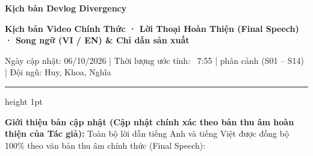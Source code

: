 \documentclass[11pt,a4paper]{article}
\begin{document}
{\LARGE\bfseries\color{divergencynavy} Kịch bản Devlog Divergency}\par
{\large\bfseries\color{divergencyaccent} Kịch bản Video Chính Thức · Lời Thoại Hoàn Thiện (Final Speech) · Song ngữ (VI / EN) \& Chỉ dẫn sản xuất}\par
\vspace{0.2em}
{\small Ngày cập nhật: 06/10/2026 \quad | \quad Thời lượng ước tính: ~7:55 \quad |  phân cảnh (S01 -- S14) \quad | \quad Đội ngũ: Huy, Khoa, Nghĩa}

\vspace{0.8em}
\hrule height 1pt
\vspace{0.8em}

\textbf{Giới thiệu bản cập nhật (Cập nhật chính xác theo bản thu âm hoàn thiện của Tác giả):}
Toàn bộ lời dẫn tiếng Anh và tiếng Việt được đồng bộ 100\% theo văn bản thu âm chính thức (Final Speech):
\end{document}
